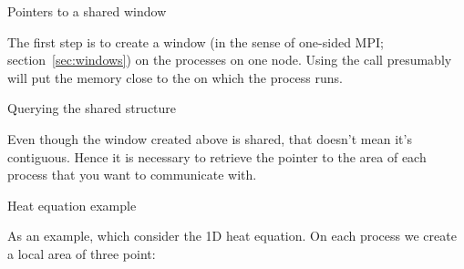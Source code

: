  {Pointers to a shared window}

The first step is to create a window (in the sense of one-sided MPI;
section~\ref{sec:windows}) on the processes on one node.
Using the  call presumably will
put the memory close to the 
 on which the process runs.



 {Querying the shared structure}

Even though the window created above is shared, that doesn't mean it's
contiguous. Hence it is necessary to retrieve the pointer to the area
of each process that you want to communicate with.



 {Heat equation example}

As an example, which consider the 1D heat equation. On each process we
create a local area of three point:
%
